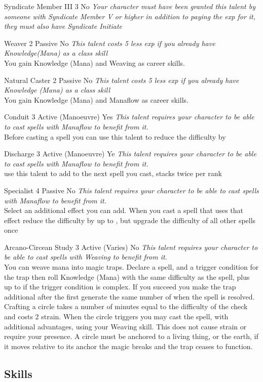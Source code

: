 \documentclass{article}
\newcommand{\WeaverPrereq}{\textit{This talent requires your character to be able to cast spells with Weaving to benefit from it.}\\}
\newcommand{\NaturalPrereq}{\textit{This talent requires your character to be able to cast spells with Manaflow to benefit from it.}\\}
\begin{document}
\begin{multicols}{2}
\Talent
{Syndicate Member III}
{3}
{}
{No}
{\textit{Your character must have been granted this talent by someone with Syndicate Member V or higher in addition to paying the exp for it, they must also have Syndicate Initiate}
}

\Talent
{Weaver}
{2}
{Passive}
{No}
{\textit{This talent costs 5 less exp if you already have Knowledge(Mana) as a class skill}\\
You gain Knowledge (Mana) and Weaving as career skills.
}

\Talent
{Natural Caster}
{2}
{Passive}
{No}
{\textit{This talent costs 5 less exp if you already have Knowledge (Mana) as a class skill}\\
You gain Knowledge (Mana) and Manaflow as career skills.
}

\Talent
{Conduit}
{3}
{Active (Manoeuvre)}
{Yes}
{\NaturalPrereq Before casting a spell you can use this talent to reduce the difficulty by \Purple[1]}

\Talent
{Discharge}
{3}
{Active (Manoeuvre)}
{Ye}
{\NaturalPrereq use this talent to add \Advantage\Advantage to the next spell you cast, stacks twice per rank}

\Talent
{Specialist}
{4}
{Passive}
{No}
{\NaturalPrereq Select an additional effect you can add. When you cast a spell that uses that effect reduce the difficulty by up to \Purple[2], but upgrade the difficulty of all other spells once}

\Talent
{Arcano-Circean Study}
{3}
{Active (Varies)}
{No}
{\WeaverPrereq You can weave mana into magic traps. Declare a spell, and a trigger condition for the trap then roll Knowledge (Mana) with the same difficulty as the spell, plus up to \Purple[2] if the trigger condition is complex. If you succeed you make the trap additional \Success after the first generate the same number of \Advantage when the spell is resolved. Crafting a circle takes a number of minutes equal to the difficulty of the check and costs 2 strain. When the circle triggers you may cast the spell, with additional advantages, using your Weaving skill. This does not cause strain or require your presence. A circle must be anchored to a living thing, or the earth, if it moves relative to its anchor the magic breaks and the trap ceases to function.}

\end{multicols}
\newpage
\subsection{Skills}
\end{document}
